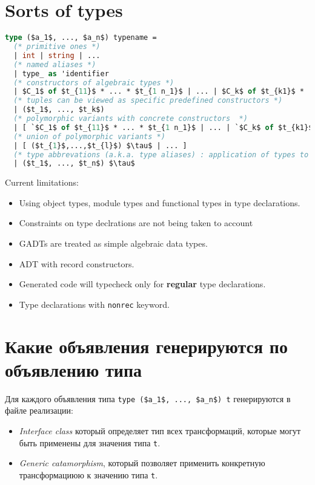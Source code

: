 \documentclass[acmsmall,review,anonymous]{acmart}\settopmatter{printfolios=true,printccs=false,printacmref=false}
\begin{document}
\section{Sorts of types}
% 

\begin{lstlisting}[language=ocaml]
type ($a_1$, ..., $a_n$) typename =
  (* primitive ones *)
  | int | string | ...
  (* named aliases *)
  | type_ as 'identifier
  (* constructors of algebraic types *)
  | $C_1$ of $t_{11}$ * ... * $t_{1 n_1}$ | ... | $C_k$ of $t_{k1}$ * ... * $t_{k n_k}$
  (* tuples can be viewed as specific predefined constructors *)
  | ($t_1$, ..., $t_k$)
  (* polymorphic variants with concrete constructors  *)
  | [ `$C_1$ of $t_{11}$ * ... * $t_{1 n_1}$ | ... | `$C_k$ of $t_{k1}$ * ... * $t_{k n_k}$ ] | [ ($t_{1}$,...,$t_{l}$) u ]
  (* union of polymorphic variants *)
  | [ ($t_{1}$,...,$t_{l}$) $\tau$ | ... ]
  (* type abbrevations (a.k.a. type aliases) : application of types to other types *)
  | ($t_1$, ..., $t_n$) $\tau$
\end{lstlisting}
Current limitations:
\begin{itemize}
 \item Using object types, module types and functional types in type declarations.
 \item Constraints on type declrations are not being taken to account
 \item GADTs are treated as simple algebraic data types.
 \item ADT with record constructors.
 \item Generated code will typecheck only for \textbf{regular} type declarations.
 \item Type declarations with \verb=nonrec= keyword.
\end{itemize}


\section{Какие объявления генерируются по объявлению типа}

Для каждого объявления типа \lstinline{type ($a_1$, ..., $a_n$) t} генерируются в файле реализации:
\begin{itemize}
 \item \textit{Interface class} который определяет тип всех трансформаций, которые могут быть применены для значения типа \lstinline{t}.
 \item \textit{Generic catamorphism}, который позволяет применить конкретную трансформациюю к значению типа \lstinline{t}.
\end{itemize}
\end{document}
